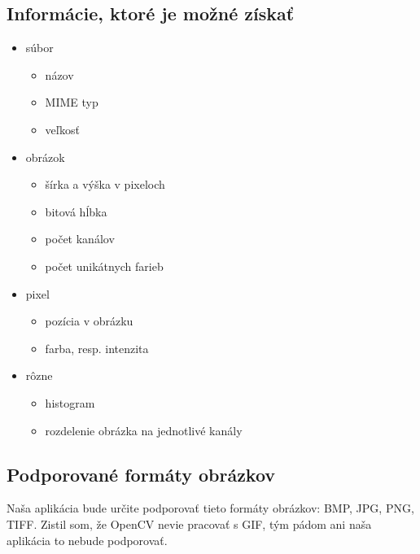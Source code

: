 \subsection{Informácie, ktoré je možné získať}
\begin{itemize}
	\item súbor
	\begin{itemize}
		\item názov
		\item MIME typ
		\item veľkosť
	\end{itemize}
	\item obrázok
	\begin{itemize}
		\item šírka a výška v pixeloch
		\item bitová hĺbka
		\item počet kanálov
		\item počet unikátnych farieb
	\end{itemize}
	\item pixel
	\begin{itemize}
		\item pozícia v obrázku
		\item farba, resp. intenzita
	\end{itemize}
	\item rôzne
	\begin{itemize}
		\item histogram
		\item rozdelenie obrázka na jednotlivé kanály
	\end{itemize}
\end{itemize}

\subsection{Podporované formáty obrázkov}
Naša aplikácia bude určite podporovať tieto formáty obrázkov: BMP, JPG, PNG, TIFF. Zistil som, že OpenCV nevie pracovať s GIF, tým pádom ani naša aplikácia to nebude podporovať.